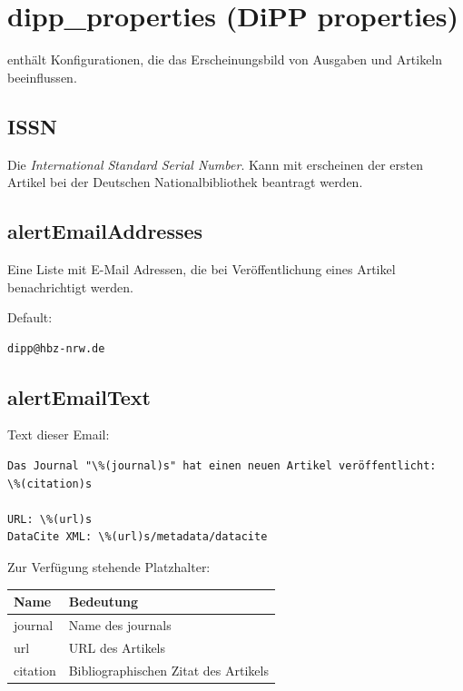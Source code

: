 \documentclass[a4paper,10pt,ngerman]{sphinxmanual}
\begin{document}
\section{dipp\_properties (DiPP properties)}
\label{dipp_properties:dipp-properties-dipp-properties}\label{dipp_properties::doc}
enthält Konfigurationen, die das Erscheinungsbild von Ausgaben und
Artikeln beeinflussen.


\subsection{ISSN}
\label{dipp_properties:prop-issn}\label{dipp_properties:issn}
Die \emph{International Standard Serial Number}. Kann mit erscheinen der ersten Artikel
bei der Deutschen Nationalbibliothek beantragt werden.


\subsection{alertEmailAddresses}
\label{dipp_properties:prop-alertemailaddresses}\label{dipp_properties:alertemailaddresses}
Eine Liste mit E-Mail Adressen, die bei Veröffentlichung eines Artikel
benachrichtigt werden.

Default:

\begin{Verbatim}[commandchars=\\\{\}]
dipp@hbz-nrw.de
\end{Verbatim}


\subsection{alertEmailText}
\label{dipp_properties:prop-alertemailtext}\label{dipp_properties:alertemailtext}
Text dieser Email:

\begin{Verbatim}[commandchars=\\\{\}]
Das Journal "\%(journal)s" hat einen neuen Artikel veröffentlicht:
\%(citation)s

URL: \%(url)s
DataCite XML: \%(url)s/metadata/datacite
\end{Verbatim}

Zur Verfügung stehende Platzhalter:

\begin{tabulary}{\linewidth}{|L|L|}
\hline
\textbf{
Name
} & \textbf{
Bedeutung
}\\\hline

journal
 & 
Name des journals
\\\hline

url
 & 
URL des Artikels
\\\hline

citation
 & 
Bibliographischen Zitat des Artikels
\\\hline
\end{tabulary}
\end{document}

